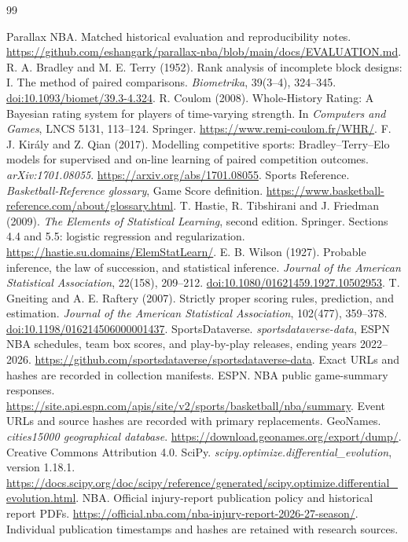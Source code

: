 \documentclass[11pt]{article}
\begin{document}
\endgroup

\clearpage
\begingroup
\raggedright
\begin{thebibliography}{99}

Parallax NBA. Matched historical evaluation and reproducibility notes.
\url{https://github.com/eshangark/parallax-nba/blob/main/docs/EVALUATION.md}.
R. A. Bradley and M. E. Terry (1952).
Rank analysis of incomplete block designs: I. The method of paired comparisons.
\emph{Biometrika}, 39(3--4), 324--345.
\href{https://doi.org/10.1093/biomet/39.3-4.324}{doi:10.1093/biomet/39.3-4.324}.
R. Coulom (2008). Whole-History Rating: A Bayesian rating system for players
of time-varying strength. In \emph{Computers and Games}, LNCS 5131,
113--124. Springer. \url{https://www.remi-coulom.fr/WHR/}.
F. J. Kir\'aly and Z. Qian (2017). Modelling competitive sports:
Bradley--Terry--Elo models for supervised and on-line learning of paired
competition outcomes. \emph{arXiv:1701.08055}.
\url{https://arxiv.org/abs/1701.08055}.
Sports Reference. \emph{Basketball-Reference glossary}, Game Score definition.
\url{https://www.basketball-reference.com/about/glossary.html}.
T. Hastie, R. Tibshirani and J. Friedman (2009).
\emph{The Elements of Statistical Learning}, second edition. Springer.
Sections 4.4 and 5.5: logistic regression and regularization.
\url{https://hastie.su.domains/ElemStatLearn/}.
E. B. Wilson (1927). Probable inference, the law of succession, and statistical inference.
\emph{Journal of the American Statistical Association}, 22(158), 209--212.
\href{https://doi.org/10.1080/01621459.1927.10502953}{doi:10.1080/01621459.1927.10502953}.
T. Gneiting and A. E. Raftery (2007).
Strictly proper scoring rules, prediction, and estimation.
\emph{Journal of the American Statistical Association}, 102(477), 359--378.
\href{https://doi.org/10.1198/016214506000001437}{doi:10.1198/016214506000001437}.
SportsDataverse. \emph{sportsdataverse-data}, ESPN NBA schedules, team box scores,
and play-by-play releases, ending years 2022--2026.
\url{https://github.com/sportsdataverse/sportsdataverse-data}.
Exact URLs and hashes are recorded in collection manifests.
ESPN. NBA public game-summary responses.
\url{https://site.api.espn.com/apis/site/v2/sports/basketball/nba/summary}.
Event URLs and source hashes are recorded with primary replacements.
GeoNames. \emph{cities15000 geographical database}.
\url{https://download.geonames.org/export/dump/}.
Creative Commons Attribution 4.0.
SciPy. \emph{scipy.optimize.differential\_evolution}, version 1.18.1.
\url{https://docs.scipy.org/doc/scipy/reference/generated/scipy.optimize.differential_evolution.html}.
NBA. Official injury-report publication policy and historical report PDFs.
\url{https://official.nba.com/nba-injury-report-2026-27-season/}.
Individual publication timestamps and hashes are retained with research sources.
\end{thebibliography}
\endgroup
\end{document}
